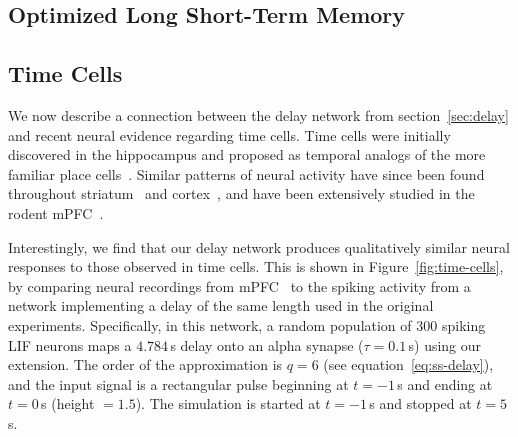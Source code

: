 
\subsection{Optimized Long Short-Term Memory}
\label{sec:delay-lstm}

\subsection{Time Cells}
\label{sec:time-cells}

We now describe a connection between the delay network from section~\ref{sec:delay} and recent neural evidence regarding time cells.
Time cells were initially discovered in the hippocampus and proposed as temporal analogs of the more familiar place cells~\citep{eichenbaum2014}.
Similar patterns of neural activity have since been found throughout striatum~\citep{mello2015scalable} and cortex~\citep{luczak2015packet}, and have been extensively studied in the rodent mPFC~\citep{kim2013neural, tiganj2016sequential}.

Interestingly, we find that our delay network produces qualitatively similar neural responses to those observed in time cells.
This is shown in Figure~\ref{fig:time-cells}, by comparing neural recordings from mPFC~\citep[][Figure~4~C,D]{tiganj2016sequential} to the spiking activity from a network implementing a delay of the same length used in the original experiments.
Specifically, in this network, a random population of $300$ spiking LIF neurons maps a $4.784$\,s delay onto an alpha synapse ($\tau = 0.1$\,s) using our extension.
The order of the approximation is $q = 6$ (see equation~\ref{eq:ss-delay}), and the input signal is a rectangular pulse beginning at $t = -1$\,s and ending at $t = 0$\,s (height $= 1.5$).
The simulation is started at $t = -1$\,s and stopped at $t = 5$\,s.

